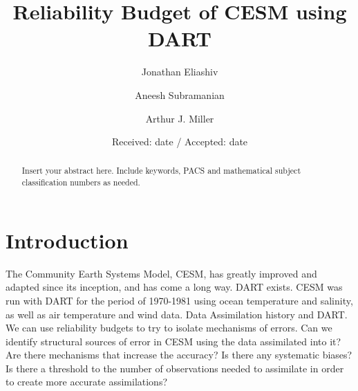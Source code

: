 \documentclass[smallextended]{svjour3}       %
\begin{document}
\title{Reliability Budget of CESM using DART
}
%



\author{Jonathan Eliashiv        \and
        Aneesh Subramanian \and
        Arthur J. Miller%
}



\date{Received: date / Accepted: date}

\maketitle

\begin{abstract}
Insert your abstract here. Include keywords, PACS and mathematical
subject classification numbers as needed.
\end{abstract}

\section{Introduction}
\label{intro}
The Community Earth Systems Model, CESM, has greatly improved and adapted since its inception, and has come a long way. DART exists. CESM was run with DART for the period of 1970-1981 using ocean temperature and salinity, as well as air temperature and wind data.
Data Assimilation history and DART.
We can use reliability budgets to try to isolate mechanisms of errors. Can we identify structural sources of error in CESM using the data assimilated into it? Are there mechanisms that increase the accuracy? Is there any systematic biases? Is there a threshold to the number of observations needed to assimilate in order to create more accurate assimilations?
\end{document}
